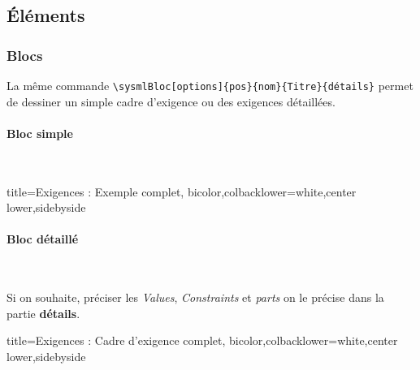 \documentclass[a4paper,11pt]{article}                      %
\begin{document}
\subsection{Éléments}

\subsubsection{Blocs}

La même commande  \verb!\sysmlBloc[options]{pos}{nom}{Titre}{détails}!  permet de dessiner un simple cadre d'exigence  ou des exigences détaillées.

\paragraph{Bloc simple}~\par


\begin{tcblisting}{title={Exigences : Exemple complet}, bicolor,colbacklower=white,center lower,sidebyside}
\end{tcblisting}

\paragraph{Bloc détaillé}~\par
Si on souhaite, préciser les \textit{Values}, \textit{Constraints}  et \textit{parts}  on le précise dans la partie \textbf{détails}.

\begin{tcblisting}{title={Exigences : Cadre d'exigence complet}, bicolor,colbacklower=white,center lower,sidebyside}
\end{tcblisting}
\end{document}
